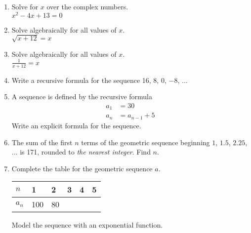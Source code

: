 \documentclass[12pt, twoside]{article}
\begin{document}
\begin{enumerate}[itemsep=0.5cm]
\newpage
\item Solve for $x$ over the complex numbers. \\[0.25cm]
$x^2-4x+13=0$
\vspace{5cm}

\item Solve algebraically for all values of $x$. \\[0.25cm]
$\sqrt{x+12}=x$ \vspace{5cm}

\item Solve algebraically for all values of $x$. \\[0.25cm]
$\displaystyle \frac{1}{x+12}=x$

\newpage
\item Write a recursive formula for the sequence 16, 8, 0, $-8$, $\ldots$ \vspace{2cm}

\item A sequence is defined by the recursive formula
\begin{align*}
a_1 &= 30 \\
a_{n} &= a_{n-1}+5
\end{align*}
Write an explicit formula for the sequence. \vspace{2cm}


\item The sum of the first $n$ terms of the geometric sequence beginning $1$, $1.5$, $2.25$, $\ldots$ is 171, rounded to \emph{the nearest integer}. Find $n$. \vspace{2cm}

\item Complete the table for the geometric sequence $a$.
    \begin{center}
    \begin{tabular}{|p{1cm}|p{1cm}|p{1cm}|p{1cm}|p{1cm}|p{1cm}|}
        \hline
        $n$ & 1 & 2 & 3 & 4 & 5 \\
        \hline
        $a_n$ & 100 & 80 & & & \\[0.25cm]
        \hline
    \end{tabular}
    \end{center}
    Model the sequence with an exponential function.



\end{enumerate}
\end{document}
